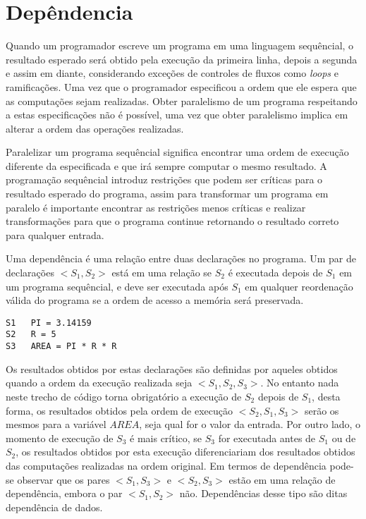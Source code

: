 
\chapter{Depêndencia}

Quando um programador escreve um programa em uma linguagem sequêncial, o
resultado esperado será obtido pela execução da primeira linha, depois a segunda
e assim em diante, considerando exceções de controles de fluxos como
\textit{loops} e ramificações. 
Uma vez que o programador especificou a ordem que ele espera que as computações 
sejam realizadas. 
Obter paralelismo de um programa respeitando a estas especificações não é
possível, uma vez que obter paralelismo implica em alterar a ordem das
operações realizadas.

Paralelizar um programa sequêncial significa encontrar uma ordem de execução
diferente da especificada e que irá sempre computar o mesmo resultado.
A programação sequêncial introduz restrições que podem ser críticas para o
resultado esperado do programa, assim para transformar um programa em paralelo é
importante encontrar as restrições menos críticas e realizar transformações para
que o programa continue retornando o resultado correto para qualquer entrada.


Uma dependência é uma relação entre duas declarações no programa. 
Um par de declarações $<S_1,S_2>$ está em uma relação se $S_2$ é executada 
depois de $S_1$ em um programa sequêncial, e deve ser executada após $S_1$ 
em qualquer reordenação válida do programa se a ordem de acesso a 
memória será preservada.

\begin{verbatim}
S1   PI = 3.14159
S2   R = 5 
S3   AREA = PI * R * R
\end{verbatim}

Os resultados obtidos por estas declarações são definidas por aqueles obtidos
quando a ordem da execução realizada seja $<S_1,S_2,S_3>$. 
No entanto nada neste trecho de código torna obrigatório a execução de 
$S_2$ depois de $S_1$, desta forma, os resultados obtidos pela ordem de execução 
$<S_2,S_1,S_3>$ serão os mesmos para a variável $AREA$, seja qual for o valor 
da entrada.
Por outro lado, o momento de execução de $S_3$ é mais crítico, se $S_3$ for
executada antes de $S_1$ ou de $S_2$, os resultados obtidos por esta execução
diferenciariam dos resultados obtidos das computações realizadas na ordem
original.
Em termos de dependência pode-se observar que os pares $<S_1,S_3>$ e $<S_2,S_3>$
estão em uma relação de dependência, embora o par $<S_1,S_2>$ não.
Dependências desse tipo são ditas dependência de dados.

